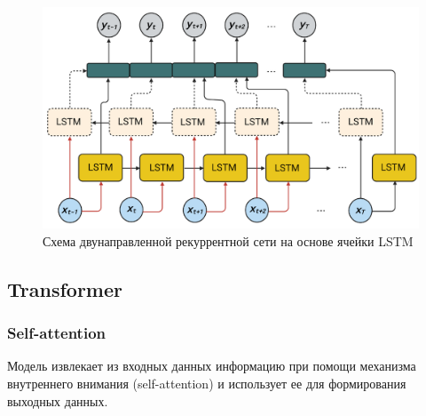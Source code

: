 \documentclass[diploma]{nanolab2015}
\begin{document}
\begin{figure}[ht]
    \centering
    \includegraphics[scale=0.2]{./assets/lstm-bidirectional.png}
    \caption{Схема двунаправленной рекуррентной сети на основе ячейки LSTM}
    \label{pic2}
\end{figure}

\subsection{Transformer}

\subsubsection{Self-attention}
Модель извлекает из входных данных информацию при помощи механизма внутреннего внимания (self-attention) и использует ее для формирования выходных данных.
\end{document}
